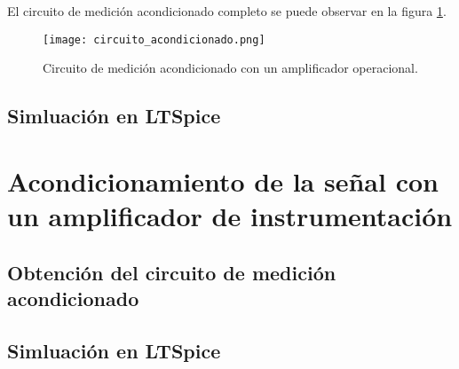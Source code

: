 \documentclass[journal,trans]{IEEEtran}
\begin{document}
El circuito de medición acondicionado completo se puede observar en la figura \ref{fig:circuito_acondicionado}.

\begin{figure}[hbtp]
	\centering
	\texttt{[image: circuito\_acondicionado.png]}
	\caption[Figura 2]{Circuito de medición acondicionado con un amplificador operacional.}
    \label{fig:circuito_acondicionado}
\end{figure}

\subsection{Simluación en LTSpice}

\section{Acondicionamiento de la señal con un amplificador de instrumentación}

\subsection{Obtención del circuito de medición acondicionado}

\subsection{Simluación en LTSpice}



\end{document}
